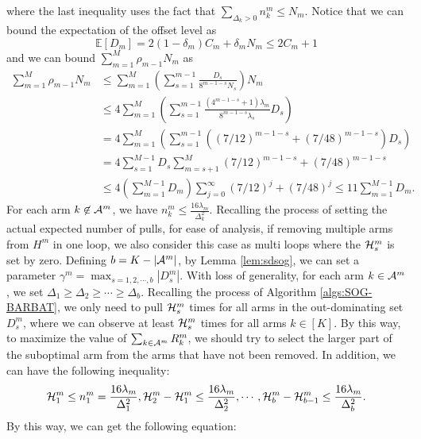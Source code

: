 where the last inequality uses the fact that $\sum_{\Delta_k>0} n_k^m\le N_m$. Notice that we can bound the expectation of the offset level as
\[\mathbb{E}[D_m] = 2(1-\delta_m)C_m + \delta_m N_m \leq 2C_m + 1\]
and we can bound $\sum_{m=1}^M \rho_{m-1} N_m$ as
\begin{equation}\label{eq:sog-mab-rho}
    \begin{split}
        \sum_{m=1}^M \rho_{m-1} N_m
        &\leq \sum_{m=1}^M \left(\sum_{s=1}^{m-1}\frac{D_s}{8^{m-1-s}N_s}\right)N_m \\
        &\leq 4\sum_{m=1}^M \left(\sum_{s=1}^{m-1}\frac{(4^{m-1-s} + 1)\lambda_m}{8^{m-1-s}\lambda_s}D_s\right) \\
        &= 4\sum_{m=1}^M \left(\sum_{s=1}^{m-1}((7/12)^{m-1-s} + (7/48)^{m-1-s})D_s\right) \\
        &= 4\sum_{s=1}^{M-1} D_s \sum_{m=s+1}^M (7/12)^{m-1-s} + (7/48)^{m-1-s}\\
        &\leq 4\left(\sum_{m=1}^{M-1} D_m\right)\sum_{j=0}^{\infty} \left(7/12\right)^{j} + \left(7/48\right)^{j} 
        \leq 11\sum_{m=1}^{M-1} D_m.
    \end{split}
\end{equation}
For each arm $k \not\in {\mathcal{A}}^m$, we have $n_k^m \leq \frac{16\lambda_m}{\Delta_k^2}$. Recalling the process of setting the actual expected number of pulls, for ease of analysis, if removing multiple arms from $H^m$ in one loop, we also consider this case as multi loops where the ${\mathcal{H}}_s^m$ is set by zero. Defining $b = K - |{\mathcal{A}}^m|$, by Lemma \ref{lem:sdsog}, we can set a parameter $\gamma^m = \max_{s = 1,2,\cdots,b} |D_s^m|$. With loss of generality, for each arm $k \in {\mathcal{A}}^m$, we set $\Delta_1 \geq \Delta_2 \geq \cdots \geq \Delta_{b}$. Recalling the process of Algorithm \ref{algs:SOG-BARBAT}, we only need to pull ${\mathcal{H}}_s^m$ times for all arms in the out-dominating set $D_s^m$, where we can observe at least ${\mathcal{H}}_s^m$ times for all arms $k \in [K]$. By this way, to maximize the value of $\sum_{k \in {\mathcal{A}}^m} R_k^m$, we should try to select the larger part of the suboptimal arm from the arms that have not been removed. In addition, we can have the following inequality:
\[{\mathcal{H}}_1^m \leq n_1^m = \frac{16\lambda_m}{\Delta_1^2}, {\mathcal{H}}_2^m - {\mathcal{H}}_1^m \leq \frac{16\lambda_m}{\Delta_2^2}, \cdots , {\mathcal{H}}_{b}^m - {\mathcal{H}}_{b - 1}^m \leq \frac{16\lambda_m}{\Delta_{b}^2}.\]
By this way, we can get the following equation:
